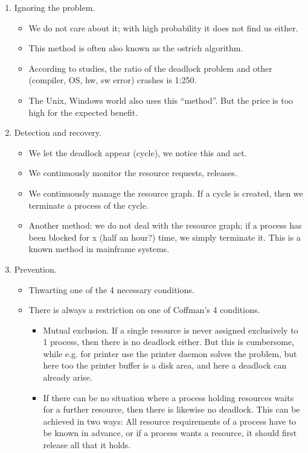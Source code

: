 \documentclass[margin=0px]{article}
\begin{document}
\begin{enumerate}
    \item Ignoring the problem.
          \begin{itemize}
              \item We do not care about it; with high probability it does not find us either.
              \item This method is often also known as the ostrich algorithm.
              \item According to studies, the ratio of the deadlock problem and other (compiler, OS, hw, sw error) crashes is 1:250.
              \item The Unix, Windows world also uses this ``method''. But the price is too high for the expected benefit.
          \end{itemize}
    \item Detection and recovery.
          \begin{itemize}
              \item We let the deadlock appear (cycle), we notice this and act.
              \item We continuously monitor the resource requests, releases.
              \item We continuously manage the resource graph. If a cycle is created, then we terminate a process of the cycle.
              \item Another method: we do not deal with the resource graph; if a process has been blocked for x (half an hour?) time, we simply terminate it. This is a known method in mainframe systems.
          \end{itemize}
    \item Prevention.
          \begin{itemize}
              \item Thwarting one of the 4 necessary conditions.
              \item There is always a restriction on one of Coffman's 4 conditions.
                    \begin{itemize}
                        \item Mutual exclusion. If a single resource is never assigned exclusively to 1 process, then there is no deadlock either. But this is cumbersome, while e.g. for printer use the printer daemon solves the problem, but here too the printer buffer is a disk area, and here a deadlock can already arise.
                        \item If there can be no situation where a process holding resources waits for a further resource, then there is likewise no deadlock. This can be achieved in two ways: All resource requirements of a process have to be known in advance, or if a process wants a resource, it should first release all that it holds.

\end{itemize}
\end{itemize}
\end{enumerate}
\end{document}
